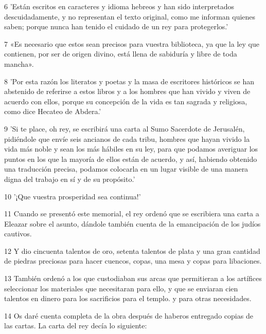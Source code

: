 \par 6 'Están escritos en caracteres y idioma hebreos y han sido interpretados descuidadamente, y no representan el texto original, como me informan quienes saben; porque nunca han tenido el cuidado de un rey para protegerlos.'

\par 7 «Es necesario que estos sean precisos para vuestra biblioteca, ya que la ley que contienen, por ser de origen divino, está llena de sabiduría y libre de toda mancha».

\par 8 'Por esta razón los literatos y poetas y la masa de escritores históricos se han abstenido de referirse a estos libros y a los hombres que han vivido y viven de acuerdo con ellos, porque su concepción de la vida es tan sagrada y religiosa, como dice Hecateo de Abdera.'

\par 9 'Si te place, oh rey, se escribirá una carta al Sumo Sacerdote de Jerusalén, pidiéndole que envíe seis ancianos de cada tribu, hombres que hayan vivido la vida más noble y sean los más hábiles en su ley, para que podamos averiguar los puntos en los que la mayoría de ellos están de acuerdo, y así, habiendo obtenido una traducción precisa, podamos colocarla en un lugar visible de una manera digna del trabajo en sí y de su propósito.'

\par 10 '¡Que vuestra prosperidad sea continua!'

\par 11 Cuando se presentó este memorial, el rey ordenó que se escribiera una carta a Eleazar sobre el asunto, dándole también cuenta de la emancipación de los judíos cautivos.

\par 12 Y dio cincuenta talentos de oro, setenta talentos de plata y una gran cantidad de piedras preciosas para hacer cuencos, copas, una mesa y copas para libaciones.

\par 13 También ordenó a los que custodiaban sus arcas que permitieran a los artífices seleccionar los materiales que necesitaran para ello, y que se enviaran cien talentos en dinero para los sacrificios para el templo. y para otras necesidades.

\par 14 Os daré cuenta completa de la obra después de haberos entregado copias de las cartas. La carta del rey decía lo siguiente:

